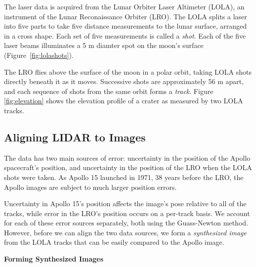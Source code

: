 \documentclass[float=false, crop=false]{standalone}
\begin{document}
The laser data is acquired from the Lunar Orbiter Laser Altimeter (LOLA), an instrument of the
Lunar Reconaissance Orbiter (LRO). The LOLA splits a laser into five parts to take five distance
measurements to the lunar surface, arranged in a cross shape. Each set of five measurements
is called a \emph{shot}. Each of the five laser beams
illuminates a 5 m diamter spot on the moon's surface (Figure~\ref{fig:lolashots}).

The LRO flies above the surface of the moon in a polar orbit, taking LOLA shots directly beneath
it as it moves.
Successive shots are approximately 56 m apart, and each sequence of shots from the same
orbit forms a \emph{track}. Figure \ref{fig:elevation} shows the elevation profile
of a crater as measured by two LOLA tracks.

\subsection{Aligning LIDAR to Images}
The data has two main sources of error: uncertainty in the position of the Apollo spacecraft's
position, and uncertainty in the position of the LRO when the LOLA shots were taken.
As Apollo 15 launched in 1971, 38 years
before the LRO, the Apollo images are subject to much larger position errors.

Uncertainty in Apollo 15's position affects the image's pose relative to all of the tracks, while
error in the LRO's position occurs on a per-track basis. We account for each of these
error sources separately, both using the Guass-Newton method. However, before we can align
the two data sources, we form a \emph{synthesized image} from the LOLA tracks that
can be easily compared to the Apollo image.


{\bf Forming Synthesized Images}
\end{document}
